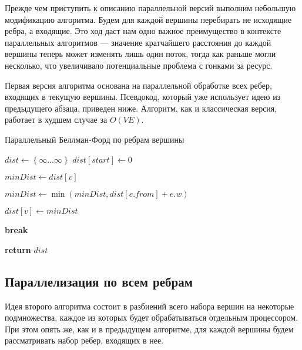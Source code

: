 Прежде чем приступить к описанию параллельной версий выполним небольшую модификацию алгоритма. Будем для каждой вершины перебирать не исходящие ребра, а входящие. Это ход даст нам одно важное преимущество в контексте параллельных алгоритмов --- значение кратчайшего расстояния до каждой вершины теперь может изменять лишь один поток, тогда как раньше могли несколько, что увеличивало потенциальные проблема с гонками за ресурс.

Первая версия алгоритма основана на параллельной обработке всех ребер, входящих в текущую вершины. Псевдокод, который уже использует идею из предыдущего абзаца, приведен ниже. Алгоритм, как и классическая версия, работает в худшем случае за $O(VE)$. 


\FloatBarrier
\begin{algorithm}
\caption{Параллельный Беллман-Форд по ребрам вершины}\label{bf_classic_par1}
\begin{algorithmic}[1]
\State $dist\gets \left\{ {\infty ... \infty}\right\}$
\State $dist[start] \gets 0$
 
		\algrenewcommand{}
		\State $minDist \gets dist[v]$

		  
			\State $minDist \gets \min(minDist, dist[e.from] + e.w)$
		\EndFor	
					
			\State $dist[v] \gets minDist$  

		\EndIf

		\algrenewcommand{}

	\EndFor
		\State \textbf{break}
	\EndIf

\EndFor
\State \textbf{return} $dist$
\EndProcedure
\end{algorithmic}
\end{algorithm}

\FloatBarrier
\subsection{Параллелизация по всем ребрам}
Идея второго алгоритма состоит в разбиений всего набора вершин на некоторые подмножества, каждое из которых будет обрабатываться отдельным процессором. При этом опять же, как и в предыдущем алгоритме, для каждой вершины будем рассматривать набор ребер, входящих в нее. 

